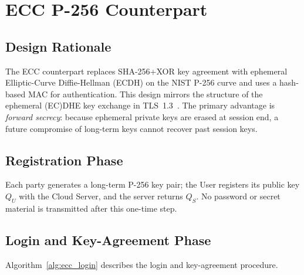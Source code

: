 \documentclass[journal]{IEEEtran}
\begin{document}


\section{ECC P-256 Counterpart}
\label{sec:ecc}

\subsection{Design Rationale}

The ECC counterpart replaces SHA-256+XOR key agreement with ephemeral
Elliptic-Curve Diffie-Hellman (ECDH) on the NIST P-256 curve and uses
a hash-based MAC for authentication. This design mirrors the structure of the
ephemeral (EC)DHE key exchange in TLS~1.3~\cite{RFC8446}. The primary
advantage is \emph{forward secrecy}: because ephemeral private keys are
erased at session end, a future compromise of long-term keys cannot recover
past session keys.

\subsection{Registration Phase}

Each party generates a long-term P-256 key pair; the User registers its
public key $Q_U$ with the Cloud Server, and the server returns $Q_S$.
No password or secret material is transmitted after this one-time step.

\subsection{Login and Key-Agreement Phase}

Algorithm~\ref{alg:ecc_login} describes the login and key-agreement
procedure.
\end{document}
